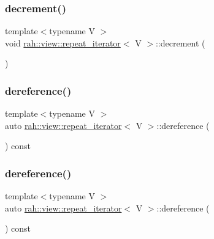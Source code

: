\subsubsection{\texorpdfstring{decrement()}{decrement()}\hspace{0.1cm}{\footnotesize\ttfamily [2/2]}}
{\footnotesize\ttfamily template$<$typename V $>$ \\
void \mbox{\hyperlink{structrah_1_1view_1_1repeat__iterator}{rah\+::view\+::repeat\+\_\+iterator}}$<$ V $>$\+::decrement (\begin{DoxyParamCaption}{ }\end{DoxyParamCaption})\hspace{0.3cm}{\ttfamily [inline]}}

\mbox{\label{structrah_1_1view_1_1repeat__iterator_ac7f8806f87e4cf8f5409ffeed044dd15}} 
\subsubsection{\texorpdfstring{dereference()}{dereference()}\hspace{0.1cm}{\footnotesize\ttfamily [1/2]}}
{\footnotesize\ttfamily template$<$typename V $>$ \\
auto \mbox{\hyperlink{structrah_1_1view_1_1repeat__iterator}{rah\+::view\+::repeat\+\_\+iterator}}$<$ V $>$\+::dereference (\begin{DoxyParamCaption}{ }\end{DoxyParamCaption}) const\hspace{0.3cm}{\ttfamily [inline]}}

\mbox{\label{structrah_1_1view_1_1repeat__iterator_ac7f8806f87e4cf8f5409ffeed044dd15}} 
\subsubsection{\texorpdfstring{dereference()}{dereference()}\hspace{0.1cm}{\footnotesize\ttfamily [2/2]}}
{\footnotesize\ttfamily template$<$typename V $>$ \\
auto \mbox{\hyperlink{structrah_1_1view_1_1repeat__iterator}{rah\+::view\+::repeat\+\_\+iterator}}$<$ V $>$\+::dereference (\begin{DoxyParamCaption}{ }\end{DoxyParamCaption}) const\hspace{0.3cm}{\ttfamily [inline]}}

